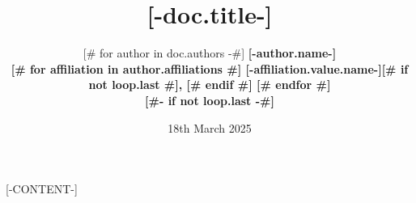 \documentclass{article}
\title{[-doc.title-]}
\author{[# for author in doc.authors -#]
\bfseries [-author.name-]\mdseries\\
[#- if author.affiliations #]
[# for affiliation in author.affiliations #]
[-affiliation.value.name-][# if not loop.last #], [# endif #]
[# endfor #]\\
[#- endif -#]
[#- if not loop.last -#]
\AND
[#- endif -#]
[#- endfor -#]
}
\date{18th March 2025}
\begin{document}
\maketitle

[-CONTENT-]
\end{document}
